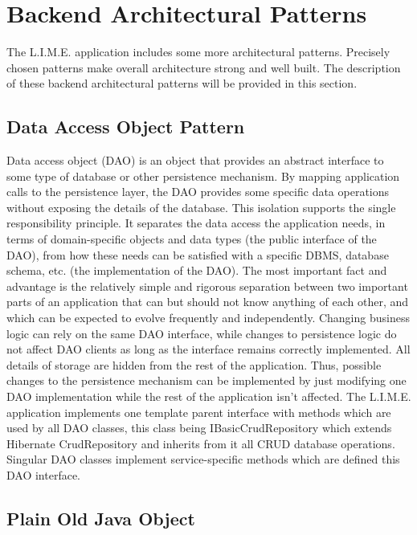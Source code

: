 \documentclass[a4paper,11pt,twoside]{report}
\theoremstyle{definition}
\begin{document}
\section{Backend Architectural Patterns}

The L.I.M.E. application includes some more architectural patterns. Precisely chosen patterns make overall architecture strong and well built. The description of these backend architectural patterns will be provided in this section. 

\subsection{Data Access Object Pattern}

Data access object (DAO) is an object that provides an abstract interface to some type of database or other persistence mechanism. By mapping application calls to the persistence layer, the DAO provides some specific data operations without exposing the details of the database. This isolation supports the single responsibility principle. It separates the data access the application needs, in terms of domain-specific objects and data types (the public interface of the DAO), from how these needs can be satisfied with a specific DBMS, database schema, etc. (the implementation of the DAO).
The most important fact and advantage is the relatively simple and rigorous separation between two important parts of an application that can but should not know anything of each other, and which can be expected to evolve frequently and independently. Changing business logic can rely on the same DAO interface, while changes to persistence logic do not affect DAO clients as long as the interface remains correctly implemented. All details of storage are hidden from the rest of the application. Thus, possible changes to the persistence mechanism can be implemented by just modifying one DAO implementation while the rest of the application isn't affected.\cite{H}
The L.I.M.E. application implements one template parent interface with methods which are used by all DAO classes, this class being IBasicCrudRepository which extends Hibernate CrudRepository and inherits from it all CRUD database operations. Singular DAO classes implement service-specific methods which are defined this DAO interface. 
 

\subsection{Plain Old Java Object}
\end{document}
